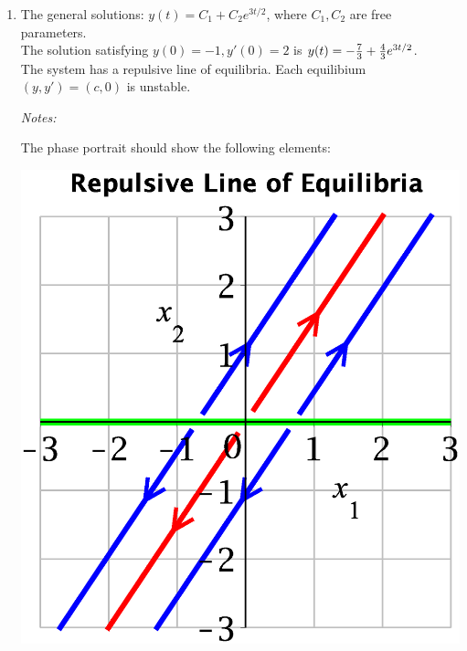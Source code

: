 \begin{enumerate}
	\item  
The general solutions: 
$\displaystyle y(t)=C_1   +C_2 e^{3t/2}$,
where $C_1,C_2$ are free parameters.\\
The solution satisfying $y(0)=-1,y'(0)=2$ is
$y(t)=-{7\over 3}   +{4\over 3} e^{3t/2}$.\\
The system has a repulsive line of equilibria.
Each equilibium $(y,y')=(c,0)$ is unstable.
\medskip

\begin{minipage}{0.65\textwidth}
{\color{red}\small\em Notes:}
	{\small \color{blue}
The phase portrait
should show the following elements:
}
\end{minipage}
\hfill
\begin{minipage}{0.3\textwidth}
\centerline{\includegraphics*[width=\textwidth]{testpr-2nd-ord-eq-repul-line.eps} }
\end{minipage}
\medskip


\end{enumerate}
